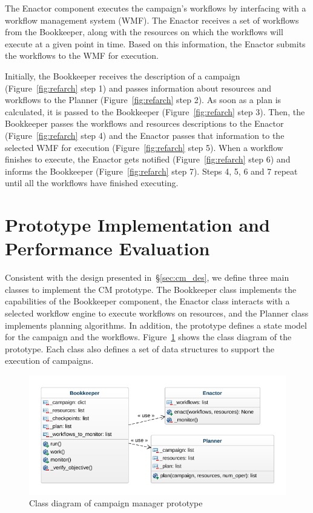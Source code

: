 The Enactor component executes the campaign's workflows by interfacing with a
workflow management system (WMF). The Enactor receives a set of workflows from
the Bookkeeper, along with the resources on which the workflows will execute at
a given point in time. Based on this information, the Enactor submits the
workflows to the WMF for execution.

Initially, the Bookkeeper receives the description of a campaign
(Figure~\ref{fig:refarch} step 1) and passes information about resources and
workflows to the Planner (Figure~\ref{fig:refarch} step 2). As soon as a plan is
calculated, it is passed to the Bookkeeper (Figure~\ref{fig:refarch} step 3).
Then, the Bookkeeper passes the workflows and resources descriptions to the
Enactor (Figure~\ref{fig:refarch} step 4) and the Enactor passes that
information to the selected WMF for execution (Figure~\ref{fig:refarch} step 5).
When a workflow finishes to execute, the Enactor gets notified
(Figure~\ref{fig:refarch} step 6) and informs the Bookkeeper
(Figure~\ref{fig:refarch} step 7). Steps 4, 5, 6 and 7 repeat until all the
workflows have finished executing.

\section{Prototype Implementation and Performance Evaluation}
\label{sec:cm_impl}

Consistent with the design presented in~\S\ref{sec:cm_des}, we define three main
classes to implement the CM prototype. The Bookkeeper class
implements the capabilities of the Bookkeeper component, the Enactor class
interacts with a selected workflow engine to execute workflows on resources, and
the Planner class implements planning algorithms. In addition, the prototype
defines a state model for the campaign and the workflows.
Figure~\ref{fig:rcm_class_diagram} shows the class diagram of the prototype.
Each class also defines a set of data structures to support the execution of campaigns.

\begin{figure}[t]
    \centering
    \includegraphics[width=.95\textwidth]{figures/manager/class_diagram.png}
    \caption{Class diagram of campaign manager prototype}\label{fig:rcm_class_diagram}
\end{figure}

